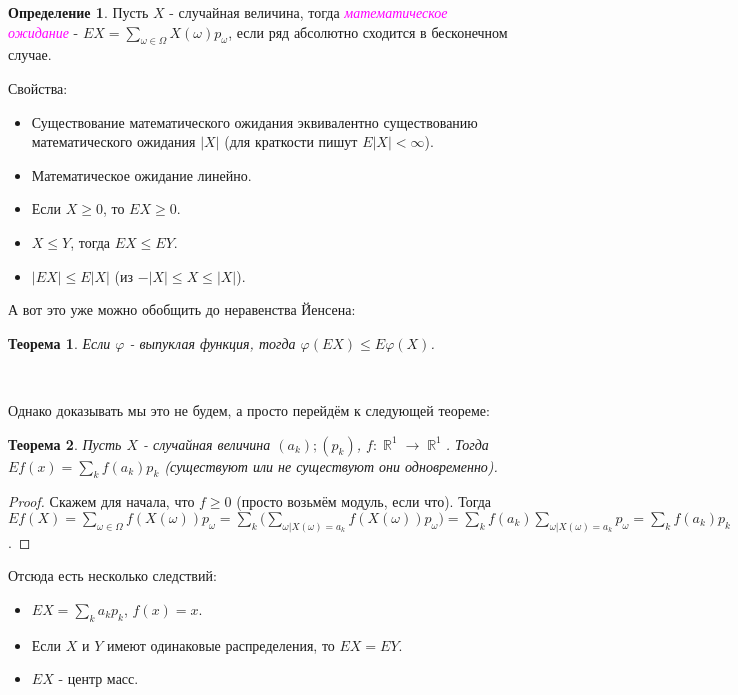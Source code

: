 \documentclass[a4paper,100pt]{article}
\theoremstyle{indented}
\newtheorem{theorem}{Теорема}
\theoremstyle{definition}
\newtheorem{defn}{Определение}
\theoremstyle{remark}
\DeclareMathOperator{\RR}{\mathbb{R}}
\begin{document}
\begin{defn}
  Пусть $X$ - случайная величина, тогда \hypertarget{n13}{\textcolor{magenta}{\textit{математическое ожидание}}} - $EX = \sum_{\omega \in \Omega} X(\omega)p_\omega$, если ряд абсолютно сходится в бесконечном случае.
\end{defn}

Свойства: \\ 

\begin{itemize}
  \item Существование математического ожидания эквивалентно существованию математического ожидания $|X|$ (для краткости пишут $E|X|<\infty$). 
  \item Математическое ожидание линейно.
  \item Если $X\geq 0$, то $EX\geq 0$. 
  \item $X\leq Y$, тогда $EX\leq EY$. 
  \item $|EX|\leq E|X|$ (из $-|X|\leq X \leq |X|$). 
\end{itemize}

А вот это уже можно обобщить до неравенства Йенсена: \\

\begin{theorem}
    Если $\varphi$ - выпуклая функция, тогда $\varphi(EX)\leq E\varphi(X)$. 
\end{theorem} \

Однако доказывать мы это не будем, а просто перейдём к следующей теореме: \\

\begin{theorem}
    Пусть $X$ - случайная величина $(a_k); (p_k)$, $f:\RR^1 \rightarrow \RR^1$. Тогда $Ef(x)=\sum_k f(a_k)p_k$ (существуют или не существуют они одновременно). 
\end{theorem}

\begin{proof}
    Скажем для начала, что $f\geq 0$ (просто возьмём модуль, если что). Тогда $E f(X)=\sum_{\omega \in \Omega} f(X(\omega))p_\omega = \sum_k \biggl( \sum_{\omega|X(\omega) = a_k} f(X(\omega)) p_\omega\biggr) = \sum_k f(a_k) \sum_{\omega | X(\omega)=a_k}p_\omega = \sum_k f(a_k)p_k$. 
\end{proof}

Отсюда есть несколько следствий:

\begin{itemize}
    \item $EX=\sum_k a_k p_k$, $f(x)=x$. 
    \item Если $X$ и $Y$ имеют одинаковые распределения, то $EX=EY$. 
    \item $EX$ - центр масс.
\end{itemize}
\end{document}
